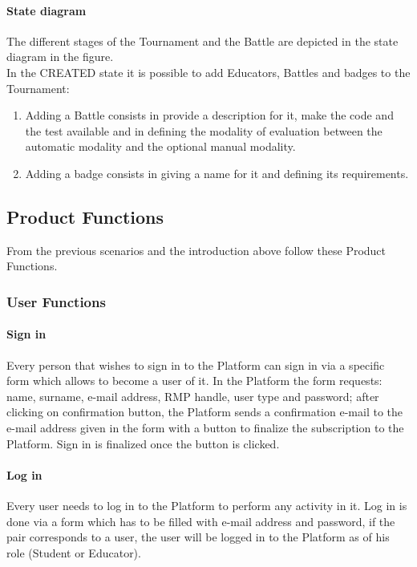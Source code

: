 \paragraph{State diagram}
The different stages of the Tournament and the Battle are depicted in the state diagram in the figure.
\\In the CREATED state it is possible to add Educators, Battles and badges to the Tournament:
\begin{enumerate}[label=$\bullet$]
    \item Adding a Battle consists in provide a description for it, make the code and the test available and in defining the modality of evaluation between the automatic modality and the optional manual modality.
    \item Adding a badge consists in giving a name for it and defining its requirements.
\end{enumerate}
\newpage

\subsection{Product Functions}
From the previous scenarios and the introduction above follow these Product Functions.

\subsubsection{User Functions}
\paragraph{Sign in}
Every person that wishes to sign in to the Platform can sign in via a specific form which allows to become a user of it.
In the Platform the form requests: name, surname, e-mail address, RMP handle, user type and password; after clicking on confirmation button, the Platform sends a confirmation e-mail to the e-mail address given in the form with a 
button to finalize the subscription to the Platform. Sign in is finalized once the button is clicked.
\paragraph{Log in}
Every user needs to log in to the Platform to perform any activity in it. Log in is done via a form which has to be filled with e-mail address and password, if the pair corresponds to a user, the user will be logged in to the 
Platform as of his role (Student or Educator).
